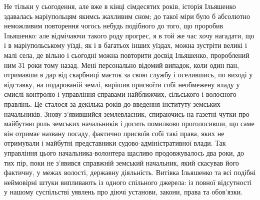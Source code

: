 \documentclass[a4paper,20pt]{report}
\begin{document}
Не тільки у сьогодення, але вже в кінці сімдесятих років, історія Ільяшенко
здавалась маріупольцям якимсь жахливим сном; до такої міри було б абсолютно
неможливим повторення чогось небудь подібного до того, що проробив Ільяшенко:
але відмічаючи такого роду прогрес, я в той же час хочу нагадати, що і в
маріупольському уїзді, як і в багатьох інших уїздах, можна зустріти великі і
малі села, де вільно і сьогодні можна повторити досвід Ільяшенко, пророблений
ним 31 роки тому назад. Мені персонально відомий випадок, коли один пан,
отримавши в дар від скарбниці маєток за свою службу і оселившись, по виході у
відставку, на подарованій землі, вирішив присвоїти собі необмежену владу у
смислі контролю і управління справами найближчих, сільського і волосного
правлінь. Це сталося за декілька років до введення інституту земських
начальників. Знову з'явившийся землевласник, спираючись на газетні чутки про
майбутню роль земських начальників і досить помилково проголосивши, що саме він
отримає названу посаду, фактично присвоїв собі такі права, яких не отримували і
майбутні представники судово-адміністративної влади. Так управління цього
начальника-волонтера щасливо продовжувалось два роки, до тих пір, поки не
з'явився справжній земський начальник, який скасував його фактичну, у межах
волості, державну діяльність. Витівка Ільяшенко та всі подібні неймовірні штуки
випливають із одного спільного джерела: із повної відсутності у нашому
суспільстві уявлень про діючі установи, закони, права та обов'язки.
\end{document}
